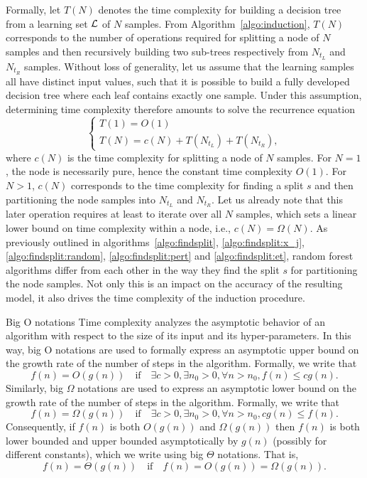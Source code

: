 Formally, let $T(N)$ denotes the time complexity for building a decision tree from a
learning set ${\cal L}$ of $N$ samples. From Algorithm~\ref{algo:induction},
$T(N)$ corresponds to the number of operations required for splitting a node of $N$ samples and then recursively
building two sub-trees respectively from $N_{t_L}$ and $N_{t_R}$ samples. Without
loss of generality, let us assume that the learning samples all have distinct
input values, such that it is possible to build a fully developed decision tree
where each leaf contains exactly one sample. Under this assumption, determining
time complexity therefore amounts to solve the recurrence equation
\begin{equation}
\begin{cases}
T(1) = O(1) \\
T(N) = c(N) + T(N_{t_L}) + T(N_{t_R}),
\end{cases}
\end{equation}
where $c(N)$ is the time complexity for splitting a node of $N$ samples. For
$N=1$, the node is necessarily pure, hence the constant time complexity
$O(1)$. For $N>1$, $c(N)$ corresponds to the time complexity for finding a
split $s$ and then partitioning the node samples into $N_{t_L}$ and $N_{t_R}$.
Let us already note that this later operation requires at least to iterate over
all $N$ samples, which sets a linear lower bound on time complexity within a
node, i.e., $c(N)=\Omega(N)$. As previously outlined in
algorithms~\ref{algo:findsplit}, \ref{algo:findsplit:x_j},
\ref{algo:findsplit:random}, \ref{algo:findsplit:pert} and
\ref{algo:findsplit:et}, random forest algorithms differ from each other
in the way they find the split $s$ for partitioning the node samples.
Not only this is an impact on the accuracy of the resulting model, it also
drives the time complexity of the induction procedure.

\begin{remark}{Big O notations}
Time complexity analyzes the asymptotic behavior of an algorithm
with respect to the size of its input and its hyper-parameters. In this way,
big O notations are used to formally express an asymptotic upper bound on the
growth rate of the number of steps in the algorithm. Formally,
we write that
\begin{equation}
f(n) =  O(g(n)) \quad\text{if}\quad \exists c > 0, \exists n_0 > 0, \forall n > n_0, f(n) \leq c g(n).
\end{equation}
Similarly, big $\Omega$ notations are used to express an asymptotic lower
bound on the growth rate of the number of steps in the algorithm. Formally,
we write that
\begin{equation}
f(n) =  \Omega(g(n)) \quad\text{if}\quad \exists c > 0, \exists n_0 > 0, \forall n > n_0,  c g(n) \leq f(n).
\end{equation}
Consequently, if $f(n)$ is both $O(g(n))$ and $\Omega(g(n))$ then $f(n)$ is
both lower bounded and upper bounded asymptotically by $g(n)$ (possibly for different constants),
which we write using big $\Theta$ notations. That is,
\begin{equation}
f(n) = \Theta(g(n)) \quad\text{if}\quad  f(n) =  O(g(n)) = \Omega(g(n)).
\end{equation}
\end{remark}

